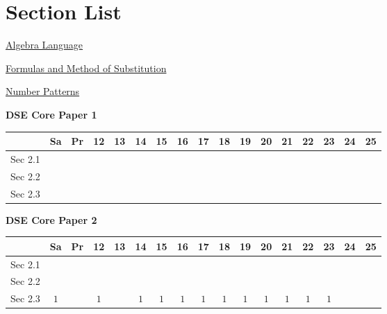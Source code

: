\documentclass[12pt, a4paper]{article}
\begin{document}
\section*{Section List}
\begin{enumx}[label=Sec 2.\arabic*\ ]
\item \hyperref[section:1-2-1]{Algebra Language}
\item \hyperref[section:1-2-2]{Formulas and Method of Substitution}
\item \hyperref[section:1-2-3]{Number Patterns}
\end{enumx}
\begin{absolutelynopagebreak}
\begin{center}
\textbf{DSE Core Paper 1}
\end{center}
\begin{center}
\begin{tabular}{|l|c|c|c|c|c|c|c|c|c|c|c|c|c|c|c|c|}
\hline
        & Sa & Pr & 12 & 13 & 14 & 15 & 16 & 17 & 18 & 19 & 20 & 21 & 22 & 23 & 24 & 25 \\\hline\hline
Sec 2.1 &  &  &  &  &  &  &  &  &  &  &  &  &  &  &  &  \\\hline
Sec 2.2 &  &  &  &  &  &  &  &  &  &  &  &  &  &  &  &  \\\hline
Sec 2.3 &  &  &  &  &  &  &  &  &  &  &  &  &  &  &  &  \\\hline
\end{tabular}
\end{center}
\end{absolutelynopagebreak}
\begin{absolutelynopagebreak}
\begin{center}
\textbf{DSE Core Paper 2}
\end{center}
\begin{center}
\begin{tabular}{|l|c|c|c|c|c|c|c|c|c|c|c|c|c|c|c|c|}
\hline
        & Sa & Pr & 12 & 13 & 14 & 15 & 16 & 17 & 18 & 19 & 20 & 21 & 22 & 23 & 24 & 25 \\\hline\hline
Sec 2.1 &  &  &  &  &  &  &  &  &  &  &  &  &  &  &  &  \\\hline
Sec 2.2 &  &  &  &  &  &  &  &  &  &  &  &  &  &  &  &  \\\hline
Sec 2.3 &  $1$ &  &  $1$ &  &  $1$ &  $1$ &  $1$ &  $1$ &  $1$ &  $1$ &  $1$ &  $1$ &  $1$ &  $1$ &  &  \\\hline
\end{tabular}
\end{center}
\end{absolutelynopagebreak}
\end{document}
